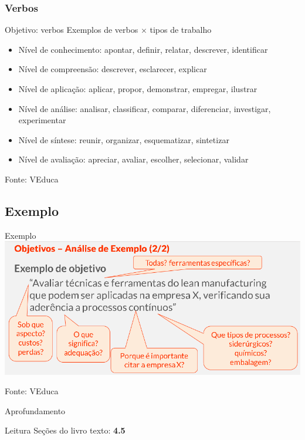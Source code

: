 \documentclass{beamer}
\begin{document}
\subsubsection{Verbos}

\begin{frame}{Objetivo: verbos}
  \footnotesize
  Exemplos de verbos $\times$ tipos de trabalho
  \begin{itemize}
    \scriptsize
\item Nível de conhecimento: apontar, definir, relatar, descrever,
    identificar
  \item Nível de compreensão: descrever, esclarecer, explicar
  \item Nível de aplicação: aplicar, propor, demonstrar, empregar, ilustrar
  \item Nível de análise: analisar, classificar, comparar,
    diferenciar, investigar, experimentar
  \item Nível de síntese: reunir, organizar, esquematizar, sintetizar
  \item Nível de avaliação: apreciar, avaliar, escolher, selecionar, validar
  \end{itemize}

  \vfill
  \scriptsize
  Fonte: VEduca
\end{frame}

\subsection{Exemplo}

\begin{frame}{Exemplo}
  \includegraphics[width=1.15\textwidth]{EstruturaI/objetivo-verbos}

  \vfill
  \scriptsize
  Fonte: VEduca
\end{frame}

\begin{frame}{Aprofundamento}
  \begin{block}{Leitura}
    Seções do livro texto: {\bf 4.5}
  \end{block}
\end{frame}
\end{document}
